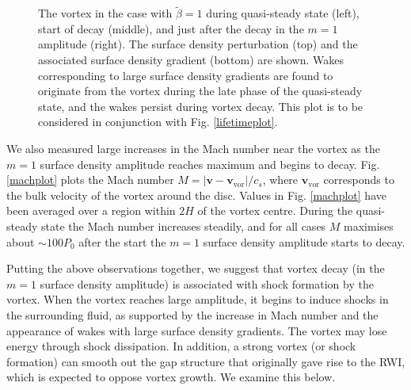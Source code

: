 \begin{figure}
{  }
  \hfill
  \caption{The vortex in the case with $\tilde{\beta}=1$
    during quasi-steady state (left), start of decay 
    (middle), and just after the decay in the $m=1$ amplitude
    (right). The surface density perturbation
    (top) and the associated surface density gradient (bottom) are
    shown. Wakes corresponding to large surface density gradients
    are found to originate from the vortex during the late phase of 
    the quasi-steady state, and the wakes persist during vortex decay. 
    This plot is to be considered in conjunction with
    Fig. \ref{lifetimeplot}. 
    \label{shockplot}}
\end{figure}

We also measured large increases in the Mach number near
the vortex as the $m=1$ surface density amplitude reaches maximum and begins to decay. 
Fig. \ref{machplot} plots the Mach number $M=|\bm{v} -
\bm{v}_\mathrm{vor}|/c_s$, where 
$\bm{v}_\mathrm{vor}$ corresponds to the bulk velocity of the vortex
around the disc. Values in Fig. \ref{machplot} have been averaged over
a region within $2H$ of the vortex centre. 
During the quasi-steady state the Mach number increases 
steadily, and for all cases $M$ maximises about
$\sim 100P_0$ after the start the $m=1$ surface density
amplitude starts to decay. 

Putting the above observations together, we suggest that vortex decay
(in the $m=1$ surface density amplitude) is associated with shock formation by
the vortex. When the vortex reaches large amplitude, it begins
to induce shocks in the surrounding fluid, as supported by the
increase in Mach number and the appearance of wakes with large surface
density gradients. The vortex may lose energy through shock
dissipation. In addition, a strong vortex (or shock formation) 
can smooth out the gap structure that originally gave rise to the
RWI, which is expected to oppose vortex growth. We examine this below.

